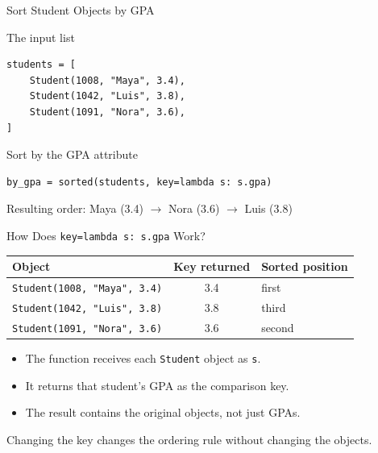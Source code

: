 \documentclass[aspectratio=169,10pt]{beamer}
\begin{document}
\begin{frame}[fragile]{Sort Student Objects by GPA}
\small
\begin{block}{The input list}
\footnotesize
\begin{verbatim}
students = [
    Student(1008, "Maya", 3.4),
    Student(1042, "Luis", 3.8),
    Student(1091, "Nora", 3.6),
]
\end{verbatim}
\end{block}
\begin{block}{Sort by the GPA attribute}
\footnotesize
\begin{verbatim}
by_gpa = sorted(students, key=lambda s: s.gpa)
\end{verbatim}
\end{block}
\begin{center}Resulting order: Maya (3.4) $\rightarrow$ Nora (3.6) $\rightarrow$ Luis (3.8)\end{center}
\end{frame}

\begin{frame}{How Does \texttt{key=lambda s: s.gpa} Work?}
\small
\begin{center}
\begin{tabular}{lcl}
\textbf{Object} & \textbf{Key returned} & \textbf{Sorted position}\\\hline
\texttt{Student(1008, "Maya", 3.4)} & 3.4 & first\\[6pt]
\texttt{Student(1042, "Luis", 3.8)} & 3.8 & third\\[6pt]
\texttt{Student(1091, "Nora", 3.6)} & 3.6 & second
\end{tabular}
\end{center}
\begin{itemize}
 \item The function receives each \texttt{Student} object as \texttt{s}.
 \item It returns that student's GPA as the comparison key.
 \item The result contains the original objects, not just GPAs.
\end{itemize}
\begin{keyidea}Changing the key changes the ordering rule without changing the objects.\end{keyidea}
\end{frame}
\end{document}
